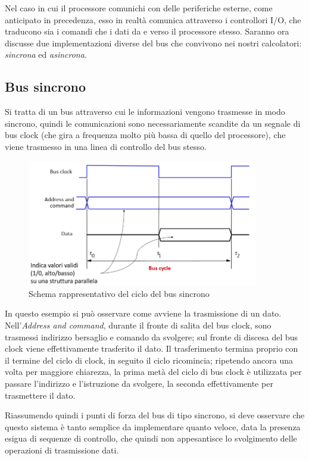 \documentclass[class=book, crop=false, oneside]{standalone}
\begin{document}
Nel caso in cui il processore comunichi con delle periferiche esterne, come anticipato in precedenza, esso in realtà comunica attraverso i controllori I/O, che traducono sia i comandi che i dati da e verso il processore stesso.
Saranno ora discusse due implementazioni diverse del bus che convivono nei nostri calcolatori: \emph{sincrona} ed \emph{asincrona}.

\subsection{Bus sincrono}
Si tratta di un bus attraverso cui le informazioni vengono trasmesse in modo sincrono, quindi le comunicazioni sono necessariamente scandite da un segnale di bus clock (che gira a frequenza molto più bassa di quello del processore), che viene trasmesso in una linea di controllo del bus stesso.

\begin{figure}[H]
	\centering
	\includegraphics[width=0.9\textwidth,keepaspectratio]{bus-sincrono}
	\caption{Schema rappresentativo del ciclo del bus sincrono}
\end{figure}

In questo esempio si può osservare come avviene la trasmissione di un dato. Nell'\emph{Address and command}, durante il fronte di salita del bus clock, sono trasmessi indirizzo bersaglio e comando da svolgere; sul fronte di discesa del bus clock viene effettivamente trasferito il dato.
Il trasferimento termina proprio con il termine del ciclo di clock, in seguito il ciclo ricomincia; ripetendo ancora una volta per maggiore chiarezza, la prima metà del ciclo di bus clock è utilizzata per passare l'indirizzo e l'istruzione da svolgere, la seconda effettivamente per trasmettere il dato.

Riassumendo quindi i punti di forza del bus di tipo sincrono, si deve osservare che questo sistema è tanto semplice da implementare quanto veloce, data la presenza esigua di sequenze di controllo, che quindi non appesantisce lo svolgimento delle operazioni di trasmissione dati.
\end{document}
